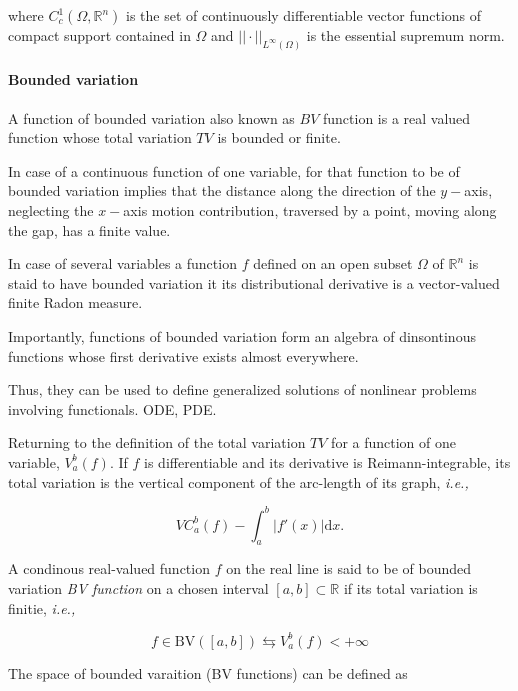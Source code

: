 where $C_c ^1(\Omega, \mathbb{R}^n)$ is the set of continuously differentiable vector functions of compact support contained in $\Omega$ and $||\cdot||_{L^{\infty}(\Omega)}$ is the essential supremum norm. 


\paragraph{Bounded variation}


A function of bounded variation also known as $BV$ function is a real valued function whose total variation $TV$ is bounded or finite. 

In case of a continuous function of one variable, for that function to be of bounded variation implies that the distance along the direction of the $y-$axis, neglecting the $x-$axis motion contribution, traversed by a point, moving along the gap, has a finite value. 

In case of several variables a function $f$ defined on an open subset $\Omega$ of $\mathbb{R}^n$ is staid to have bounded variation it its distributional derivative is a vector-valued finite Radon measure.

Importantly, functions of bounded variation form an algebra of dinsontinous functions whose first derivative exists almost everywhere. 

Thus, they can be used to define generalized solutions of nonlinear problems involving functionals. ODE, PDE.

Returning to the definition of the total variation $TV$ for a function of one variable, $V_a ^b (f)$. 
If $f$ is differentiable and its derivative is Reimann-integrable, its total variation is the vertical component of the arc-length of its graph, \textit{i.e.,}

\begin{equation}
VC_a ^b(f) - \int_a ^b |f'(x)|\text{d}x.
\end{equation}

A condinous real-valued function $f$ on the real line is said to be of bounded variation \textit{BV function} on a chosen interval $[a, b]\subset \mathbb{R}$ if its total variation is finitie, \textit{i.e.,}

\begin{equation}
f\in\text{BV}([a,b]) \leftrightarrows V_a ^b (f) < +\infty
\end{equation}

The space of bounded varaition (BV functions) can be defined as 

